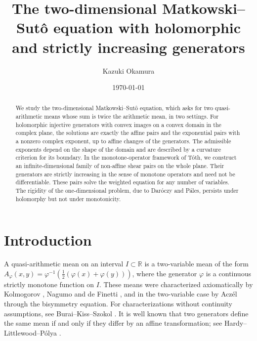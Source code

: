 \documentclass[a4paper, reqno, 11pt]{amsart}
\theoremstyle{definition}
\begin{document}
\title[]{The two-dimensional Matkowski--Sut\^o equation with holomorphic and strictly increasing generators}
\author{Kazuki Okamura}
\date{\today}
\address{Department of Mathematics, Faculty of Science, Shizuoka University, 836 Ohya, Suruga-ku, Shizuoka 422-8529, Japan}

\begin{abstract}
We study the two-dimensional Matkowski--Sut\^o equation, which asks for two quasi-arithmetic means whose sum is twice the arithmetic mean, in two settings.
For holomorphic injective generators with convex images on a convex domain in the complex plane, the solutions are exactly the affine pairs and the exponential pairs with a nonzero complex exponent, up to affine changes of the generators. 
The admissible exponents depend on the shape of the domain and are described by a curvature criterion for its boundary. 
In the monotone-operator framework of T\'oth, we construct an infinite-dimensional family of non-affine shear pairs on the whole plane. 
Their generators are strictly increasing in the sense of monotone operators and need not be differentiable. 
These pairs solve the weighted equation for any number of variables. 
The rigidity of the one-dimensional problem, due to Dar\'oczy and P\'ales, persists under holomorphy but not under monotonicity.
\end{abstract}

\maketitle




\section{Introduction}

A quasi-arithmetic mean on an interval $I \subset \mathbb{R}$ is a two-variable mean of the form $A_{\varphi}(x,y) = \varphi^{-1}\left( \tfrac{1}{2}(\varphi(x) + \varphi(y)) \right)$, where the generator $\varphi$ is a continuous strictly monotone function on $I$.
These means were characterized axiomatically by Kolmogorov \cite{Kolmogorov}, Nagumo \cite{Nagumo} and de Finetti \cite{deFinetti}, and in the two-variable case by Acz\'el \cite{Aczel66} through the bisymmetry equation. 
For characterizations without continuity assumptions, see Burai--Kiss--Szokol \cite{BuraiKissSzokol}.
It is well known that two generators define the same mean if and only if they differ by an affine transformation; see Hardy--Littlewood--P\'olya \cite[Theorem 83 and Section 3.7]{HLP}.
\end{document}
